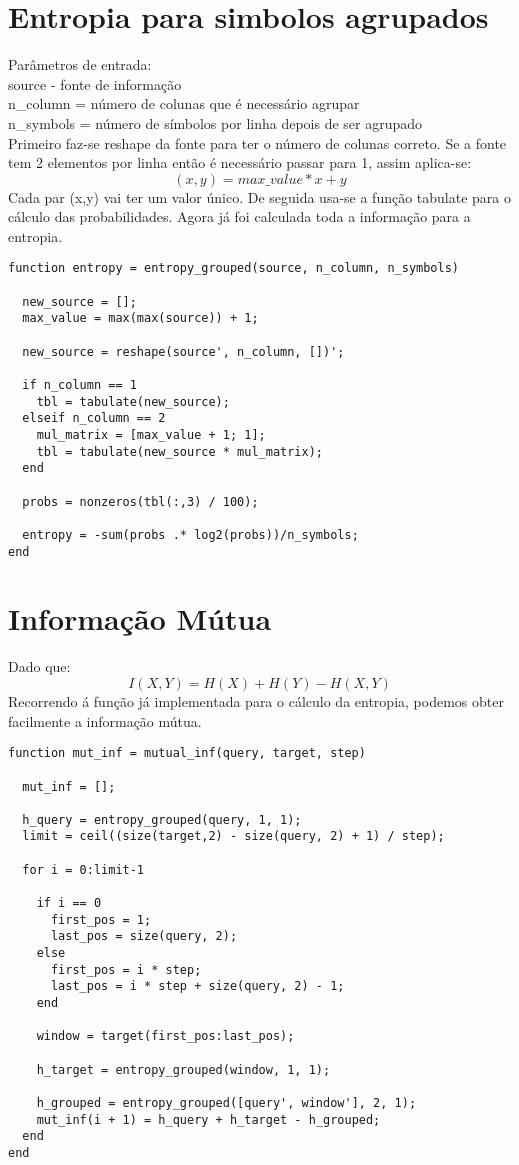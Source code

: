 \documentclass[11pt]{article}
\begin{document}
\section{Entropia para simbolos agrupados}
Parâmetros de entrada:\\
source - fonte de informação\\
n\_column = número de colunas que é necessário agrupar\\
n\_symbols = número de símbolos por linha depois de ser agrupado\\
Primeiro faz-se reshape da fonte para ter o número de colunas correto. Se a fonte tem 2 elementos por linha então é necessário passar para 1, assim aplica-se:
\begin{equation}
(x, y) = max\_value * x + y
\end{equation}
Cada par (x,y) vai ter um valor único.
De seguida usa-se a função tabulate para o cálculo das probabilidades. Agora já foi calculada toda a informação para a entropia.
\begin{lstlisting}
function entropy = entropy_grouped(source, n_column, n_symbols)	

  new_source = [];
  max_value = max(max(source)) + 1;

  new_source = reshape(source', n_column, [])';

  if n_column == 1
    tbl = tabulate(new_source);
  elseif n_column == 2
    mul_matrix = [max_value + 1; 1];
    tbl = tabulate(new_source * mul_matrix);
  end

  probs = nonzeros(tbl(:,3) / 100);

  entropy = -sum(probs .* log2(probs))/n_symbols;
end
\end{lstlisting}
\newpage
\section{Informação Mútua}
Dado que:
\begin{equation}
I(X,Y) = H(X) + H(Y) - H(X,Y)
\end{equation}
Recorrendo á função já implementada para o cálculo da entropia, podemos obter facilmente a informação mútua.
\begin{lstlisting}
function mut_inf = mutual_inf(query, target, step)

  mut_inf = [];

  h_query = entropy_grouped(query, 1, 1);
  limit = ceil((size(target,2) - size(query, 2) + 1) / step);

  for i = 0:limit-1

    if i == 0
      first_pos = 1;
      last_pos = size(query, 2);
    else
      first_pos = i * step;
      last_pos = i * step + size(query, 2) - 1;
    end

    window = target(first_pos:last_pos);

    h_target = entropy_grouped(window, 1, 1);

    h_grouped = entropy_grouped([query', window'], 2, 1);
    mut_inf(i + 1) = h_query + h_target - h_grouped;
  end
end
\end{lstlisting}
\end{document}
